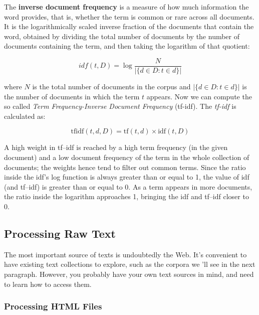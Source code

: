 \documentclass[11pt]{article}
\begin{document}
    The \textbf{inverse document frequency} is a measure of how much
information the word provides, that is, whether the term is common or
rare across all documents. It is the logarithmically scaled inverse
fraction of the documents that contain the word, obtained by dividing
the total number of documents by the number of documents containing the
term, and then taking the logarithm of that quotient:

\begin{equation}
idf(t, D) = \log \frac{N}{\vert\{d \in D : t \in d  \}\vert}
\end{equation}

    where \(N\) is the total number of documents in the corpus and
\(\vert\{d \in D : t \in d \}\vert\) is the number of documents in which
the term \(t\) appears. Now we can compute the so called \emph{Term
Frequency-Inverse Document Frequency} (tf-idf). The \emph{tf-idf} is
calculated as:

\begin{equation}
\text{tfidf}(t, d, D) = \text{tf}(t, d) \times \text{idf}(t,D)
\end{equation}

A high weight in tf--idf is reached by a high term frequency (in the
given document) and a low document frequency of the term in the whole
collection of documents; the weights hence tend to filter out common
terms. Since the ratio inside the idf's log function is always greater
than or equal to 1, the value of idf (and tf--idf) is greater than or
equal to 0. As a term appears in more documents, the ratio inside the
logarithm approaches 1, bringing the idf and tf--idf closer to 0.

    \hypertarget{processing-raw-text}{%
\subsection{Processing Raw Text}\label{processing-raw-text}}

    The most important source of texts is undoubtedly the Web. It's
convenient to have existing text collections to explore, such as the
corpora we 'll see in the next paragraph. However, you probably have
your own text sources in mind, and need to learn how to access them.

    \hypertarget{processing-html-files}{%
\subsubsection{Processing HTML Files}\label{processing-html-files}}
\end{document}
